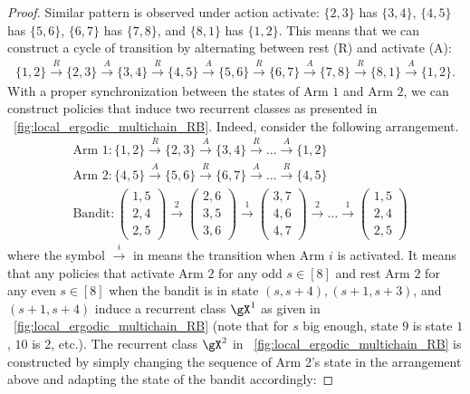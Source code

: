 \begin{proof}
    Similar pattern is observed under action activate: $\{2,3\}$ has $\{3,4\}$, $\{4,5\}$ has $\{5,6\}$, $\{6,7\}$ has $\{7,8\}$, and $\{8,1\}$ has $\{1,2\}$.
    This means that we can construct a cycle of transition by alternating between rest (R) and activate (A):
    \begin{align*}
        \{1,2\} \overset{R}{\to} \{2,3\} \overset{A}{\to} \{3,4\} \overset{R}{\to} \{4,5\} \overset{A}{\to} \{5,6\} \overset{R}{\to} \{6,7\} \overset{A}{\to} \{7,8\} \overset{R}{\to} \{8,1\} \overset{A}{\to} \{1,2\}.
    \end{align*}
    With a proper synchronization between the states of Arm $1$ and Arm $2$, we can construct policies that induce two recurrent classes as presented in \figurename~\ref{fig:local_ergodic_multichain_RB}.
    Indeed, consider the following arrangement.
    \begin{align}
        &\text{Arm 1} : \{1,2\} \overset{R}{\to} \{2,3\} \overset{A}{\to} \{3,4\} \overset{R}{\to} \dots \overset{A}{\to} \{1,2\} \nonumber \\
        &\text{Arm 2} : \{4,5\} \overset{A}{\to} \{5,6\} \overset{R}{\to} \{6,7\} \overset{A}{\to} \dots \overset{R}{\to} \{4,5\} \nonumber \\
        &\text{Bandit} : \begin{pmatrix}1,5\\2,4\\2,5\end{pmatrix} \overset{2}{\to} \begin{pmatrix}2,6\\3,5\\3,6\end{pmatrix} \overset{1}{\to} \begin{pmatrix}3,7\\4,6\\4,7\end{pmatrix} \overset{2}{\to} \dots \overset{1}{\to} \begin{pmatrix}1,5\\2,4\\2,5\end{pmatrix} \label{eq:mdp_transition}
    \end{align}
    where the symbol $\overset{i}{\to}$ in  means the transition when Arm $i$ is activated.
    It means that any policies that activate Arm $2$ for any odd $s\in[8]$ and rest Arm $2$ for any even $s\in[8]$ when the bandit is in state $(s,s+4), (s+1,s+3)$, and $(s+1,s+4)$ induce a recurrent class $\gX^1$ as given in \figurename~\ref{fig:local_ergodic_multichain_RB} (note that for $s$ big enough, state $9$ is state $1$, $10$ is $2$, etc.).
    The recurrent class $\gX^2$ in \figurename~\ref{fig:local_ergodic_multichain_RB} is constructed by simply changing the sequence of Arm 2's state in the arrangement above and adapting the state of the bandit accordingly:


\end{proof}
